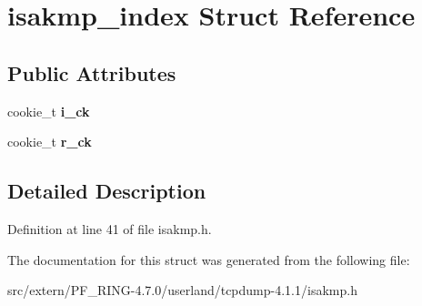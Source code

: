 \hypertarget{structisakmp__index}{
\section{isakmp\_\-index Struct Reference}
\label{structisakmp__index}
}
\subsection*{Public Attributes}
\begin{DoxyCompactItemize}
\item 
\hypertarget{structisakmp__index_a05d6a07e926f3bbd4c51d49ca6a995fc}{
cookie\_\-t {\bfseries i\_\-ck}}
\label{structisakmp__index_a05d6a07e926f3bbd4c51d49ca6a995fc}

\item 
\hypertarget{structisakmp__index_a459780864135519c4e2e60d96e32932a}{
cookie\_\-t {\bfseries r\_\-ck}}
\label{structisakmp__index_a459780864135519c4e2e60d96e32932a}

\end{DoxyCompactItemize}


\subsection{Detailed Description}


Definition at line 41 of file isakmp.h.



The documentation for this struct was generated from the following file:\begin{DoxyCompactItemize}
\item 
src/extern/PF\_\-RING-\/4.7.0/userland/tcpdump-\/4.1.1/isakmp.h\end{DoxyCompactItemize}

